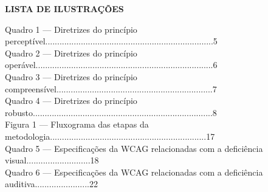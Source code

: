 \documentclass[a4paper]{article}
\begin{document}
\begin{titlepage}
	\begin{center}
		{\large \textbf{LISTA DE ILUSTRAÇÕES}}\\[1cm]
	\end{center}
	Quadro 1 — Diretrizes do princípio perceptível.......................................................................\hspace{0.4cm}5\\[0.5cm]
	Quadro 2 — Diretrizes do princípio operável...........................................................................\hspace{0.4cm}6\\[0.5cm]
	Quadro 3 — Diretrizes do princípio compreensível..................................................................\hspace{0.4cm}7\\[0.5cm]
	Quadro 4 — Diretrizes do princípio robusto............................................................................\hspace{0.4cm}8\\[0.5cm]
	Figura 1 — Fluxograma das etapas da metodologia..................................................................\hspace{0.2cm}17\\[0.5cm]
	Quadro 5 — Especificações da WCAG relacionadas com a deficiência visual...........................\hspace{0.2cm}18\\[0.5cm]
	Quadro 6 — Especificações da WCAG relacionadas com a deficiência auditiva.......................\hspace{0.2cm}22\\[0.5cm]	
\end{titlepage}
\end{document}
